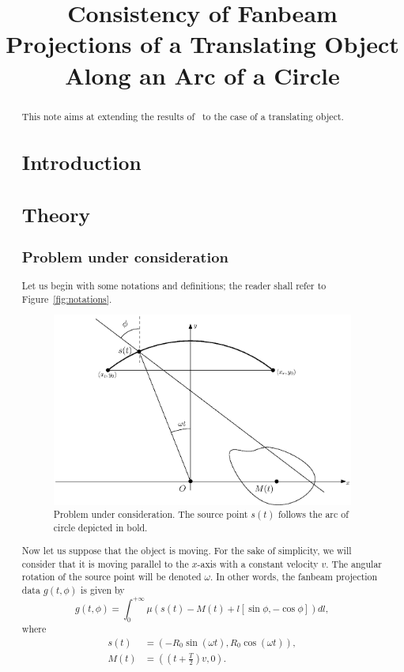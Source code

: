 \documentclass[a4paper]{article}
\title{Consistency of Fanbeam Projections of a Translating Object Along an Arc of a Circle}
\author{}
\date{}
\numberwithin{equation}{section}
\begin{document}
\maketitle

\begin{abstract}
This note aims at extending the results of~\cite{clackdoyle2015consistency} to the case of a translating object.

\section{Introduction}

\section{Theory} 
\label{sec:theory}

\subsection{Problem under consideration}
\label{sub:problem_under_consideration}

Let us begin with some notations and definitions; the reader shall refer to Figure~\ref{fig:notations}.
\begin{figure}[!ht]
	\centering
	\includegraphics[width=10cm]{figs/frame_scanner.eps}
	\caption{Problem under consideration. The source point $s(t)$ follows the arc of circle depicted in bold.\label{fig:notations}}
\end{figure}


Now let us suppose that the object is moving. For the sake of simplicity, we will consider that it is moving parallel to the $x$-axis with a constant velocity $v$. The angular rotation of the source point will be denoted $\omega$. In other words, the fanbeam projection data $g(t,\phi)$ is given by
\begin{equation}
	g(t,\phi) = \int_0^{+\infty} \mu \left( s(t) - M(t) + l \left[ \sin \phi, -\cos \phi \right] \right) dl,
\end{equation}
where
\begin{align}
s(t) & = \left( -R_0 \sin(\omega t), R_0 \cos(\omega t) \right), \\
M(t) & =  \left( \left( t + \frac{T}{2} \right)v, 0 \right).
\end{align}


\end{abstract}
\end{document}
